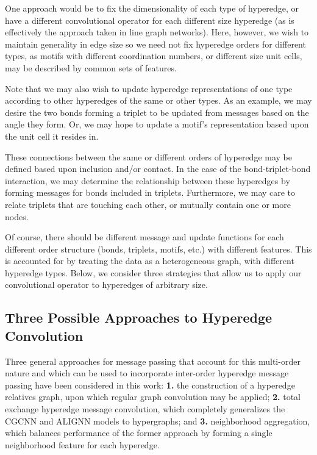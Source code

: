 \documentclass[10pt,a4paper]{article}
\begin{document}
One approach would be to fix the dimensionality of each type of hyperedge, or have a different convolutional operator for each different size hyperedge (as is effectively the approach taken in line graph networks). Here, however, we wish to maintain generality in edge size so we need not fix hyperedge orders for different types, as motifs with different coordination numbers, or different size unit cells, may be described by common sets of features.

Note that we may also wish to update hyperedge representations of one type according to other hyperedges of the same or other types. As an example, we may desire the two bonds forming a triplet to be updated from messages based on the angle they form. Or, we may hope to update a motif's representation based upon the unit cell it resides in. 

These connections between the same or different orders of hyperedge may be defined based upon inclusion and/or contact. In the case of the bond-triplet-bond interaction, we may determine the relationship between these hyperedges by forming messages for bonds included in triplets. Furthermore, we may care to relate triplets that are touching each other, or mutually contain one or more nodes.

Of course, there should be different message and update functions for each different order structure (bonds, triplets, motifs, etc.) with different features. This is accounted for by treating the data as a heterogeneous graph, with different hyperedge types. Below, we consider three strategies that allow us to apply our convolutional operator to hyperedges of arbitrary size.


\subsection{Three Possible Approaches to Hyperedge Convolution}

Three general approaches for message passing that account for this multi-order nature and which can be used to incorporate inter-order hyperedge message passing have been considered in this work: \textbf{1.} the construction of a hyperedge relatives graph, upon which regular graph convolution may be applied; \textbf{2.} total exchange hyperedge message convolution, which completely generalizes the CGCNN \cite{cgcnn} and ALIGNN \cite{alignn} models to hypergraphs; and \textbf{3.} neighborhood aggregation, which balances performance of the former approach by forming a single neighborhood feature for each hyperedge.
\end{document}
